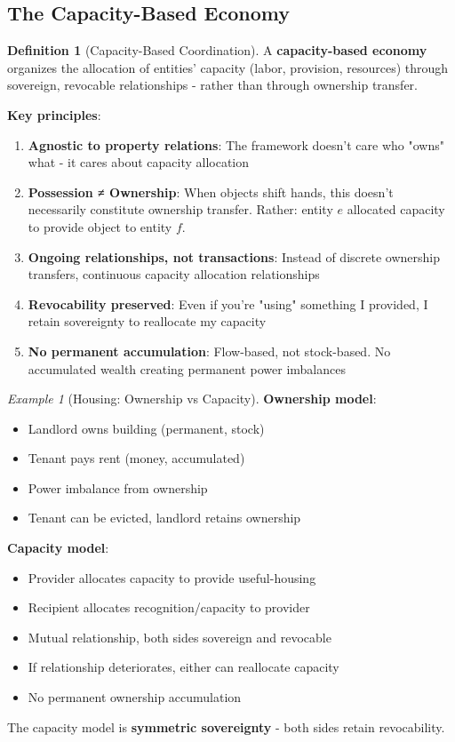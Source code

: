 \documentclass[11pt,a4paper]{article}
\theoremstyle{definition}
\newtheorem{definition}[theorem]{Definition}
\theoremstyle{remark}
\newtheorem{example}[theorem]{Example}
\begin{document}
\subsection{The Capacity-Based Economy}

\begin{definition}[Capacity-Based Coordination]
A \textbf{capacity-based economy} organizes the allocation of entities' capacity (labor, provision, resources) through sovereign, revocable relationships - rather than through ownership transfer.
\end{definition}

\textbf{Key principles}:

\begin{enumerate}
\item \textbf{Agnostic to property relations}: The framework doesn't care who "owns" what - it cares about capacity allocation

\item \textbf{Possession ≠ Ownership}: When objects shift hands, this doesn't necessarily constitute ownership transfer. Rather: entity $e$ allocated capacity to provide object to entity $f$.

\item \textbf{Ongoing relationships, not transactions}: Instead of discrete ownership transfers, continuous capacity allocation relationships

\item \textbf{Revocability preserved}: Even if you're "using" something I provided, I retain sovereignty to reallocate my capacity

\item \textbf{No permanent accumulation}: Flow-based, not stock-based. No accumulated wealth creating permanent power imbalances
\end{enumerate}

\begin{example}[Housing: Ownership vs Capacity]
\textbf{Ownership model}:
\begin{itemize}
\item Landlord owns building (permanent, stock)
\item Tenant pays rent (money, accumulated)
\item Power imbalance from ownership
\item Tenant can be evicted, landlord retains ownership
\end{itemize}

\textbf{Capacity model}:
\begin{itemize}
\item Provider allocates capacity to provide useful-housing
\item Recipient allocates recognition/capacity to provider
\item Mutual relationship, both sides sovereign and revocable
\item If relationship deteriorates, either can reallocate capacity
\item No permanent ownership accumulation
\end{itemize}

The capacity model is \textbf{symmetric sovereignty} - both sides retain revocability.
\end{example}
\end{document}
